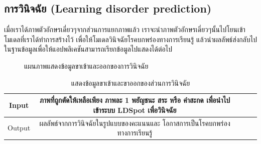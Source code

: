 \documentclass[12pt,oneside,openright,a4paper]{cpe-thai-project}
\begin{document}
  \subsection{การวินิจฉัย (Learning disorder prediction)}
  เมื่อเราได้ภาพตัวอักษรเดี่ยวๆจากส่วนการแยกภาพแล้ว เราจะนำภาพตัวอักษรเดี่ยวๆนั้นไปโยนเข้าโมเดลที่เราได้ทำการสร้างไว้ 
  เพื่อให้โมเดลวินิจฉัยโรคบกพร่องทางการเรียนรู้ แล้วนำผลลัพธ์ส่งกลับไปในฐานข้อมูลเพื่อให้แอปพลิเคชันสามารถเรียกข้อมูลไปแสดงได้ต่อไป 
  \begin{figure}[!ht]\centering
    \setlength{\fboxrule}{0.2mm} %
    \setlength{\fboxsep}{1cm}
    \caption{แผนภาพแสดงข้อมูลขาเข้าและออกของการวินิจฉัย}\label{fig:system}
   \end{figure}
  \begin{table}[!h]\centering
    \caption{แสดงข้อมูลขาเข้าและขาออกของส่วนการวินิจฉัย}\label{tbl:application1}
    \begin{tabular}{c|c|l|rr} \hline
    Input & ภาพที่ถูกตัดให้เหลือเพียง ภาพละ 1 พยัญชนะ สระ หรือ คำสะกด เพื่อนำไปเข้าระบบ LDSpot เพื่อวินิจฉัย  \\ \hline
    Output & ผลลัพธ์จากการวินิจฉัยในรูปแบบของคะแนนและ โอกาสการเป็นโรคบกพร่องทางการเรียนรู้ \\ \hline
    \end{tabular}
    \end{table}
\end{document}
